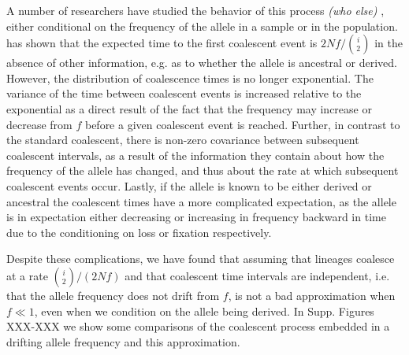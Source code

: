 \documentclass[a4paper,10pt]{article}
\newcommand{\jb}[1]{{\it\color{blue} (#1)} }
\begin{document}
A number of researchers have studied the behavior of this process \citep{Wiuf1999,Wiuf:2000js} \jb{who else}, either conditional on the frequency of the allele in a sample or in the population. \cite{Wiuf:2000js} has shown that the expected time to the first coalescent event is $2 N f/ {i \choose 2}$ in the absence of other information, e.g. as to whether the allele is ancestral or derived. However, the distribution of coalescence times is no longer exponential. The variance of the time between coalescent events is increased relative to the exponential as a direct result of the fact that the frequency may increase or decrease from $f$ before a given coalescent event is reached. Further, in contrast to the standard coalescent, there is non-zero covariance between subsequent coalescent intervals, as a result of the information they contain about how the frequency of the allele has changed, and thus about the rate at which subsequent coalescent events occur. Lastly, if the allele is known to be either derived or ancestral the coalescent times have a more complicated expectation, as the allele is in expectation either decreasing or increasing in frequency backward in time due to the conditioning on loss or fixation respectively.

%
%


Despite these complications, we have found that assuming that lineages coalesce at a rate $ {i \choose 2}/(2 N f)$ and that coalescent time intervals are independent, i.e. that the allele frequency does not drift from $f$, is not a bad approximation when $f \ll 1$, even when we condition on the allele being derived. In Supp. Figures XXX-XXX we show some comparisons of the coalescent process embedded in a drifting allele frequency and this approximation.
\end{document}

